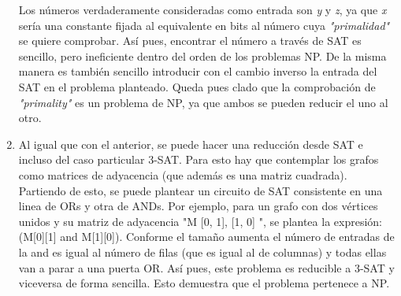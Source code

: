 \documentclass[10pt]{article}
\begin{document}
\begin{enumerate}
	Los números verdaderamente consideradas como entrada son \textit{y} y \textit{z}, ya que \textit{x} sería una constante fijada al equivalente en bits al número cuya \textit{"primalidad"} se quiere comprobar. Así pues, encontrar el número a través de SAT es sencillo, pero ineficiente dentro del orden de los problemas NP. De la misma manera es también sencillo introducir con el cambio inverso la entrada del SAT en el problema planteado. Queda pues clado que la comprobación de \textit{"primality"} es un problema de NP, ya que ambos se pueden reducir el uno al otro.\\
	
	\item Al igual que con el anterior, se puede hacer una reducción desde SAT e incluso del caso particular 3-SAT. Para esto hay que contemplar los grafos como matrices de adyacencia (que además es una matriz  cuadrada). Partiendo de esto, se puede plantear un circuito de SAT consistente en una linea de ORs y otra de ANDs. Por ejemplo, para un grafo con dos vértices unidos y su matriz de adyacencia "M{ [0, 1], [1, 0] }", se plantea la expresión: (M[0][1] and M[1][0]). Conforme el tamaño aumenta el número de entradas de la and es igual al número de filas (que es igual al de columnas) y todas ellas van a parar a una puerta OR. Así pues, este problema es reducible a 3-SAT y viceversa de forma sencilla. Esto demuestra que el problema pertenece a NP.


\end{enumerate}
\end{document}
